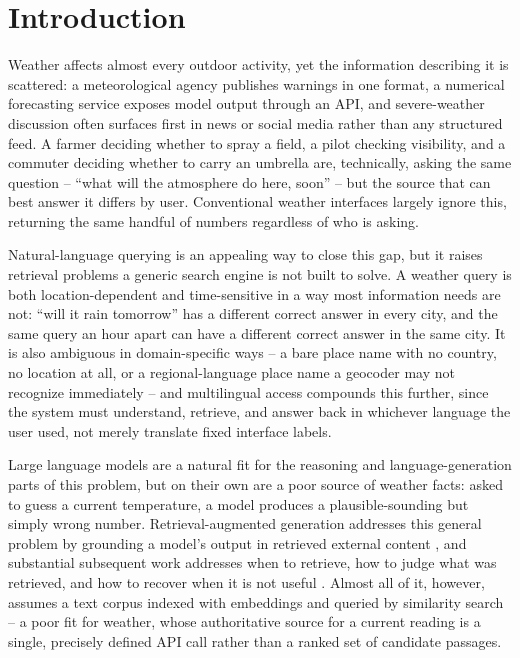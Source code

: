 \documentclass[sigconf,natbib=true,anonymous=true]{acmart}
\begin{document}
\maketitle

\section{Introduction}

Weather affects almost every outdoor activity, yet the information describing it is scattered: a meteorological agency publishes warnings in one format, a numerical forecasting service exposes model output through an API, and severe-weather discussion often surfaces first in news or social media rather than any structured feed. A farmer deciding whether to spray a field, a pilot checking visibility, and a commuter deciding whether to carry an umbrella are, technically, asking the same question -- ``what will the atmosphere do here, soon'' -- but the source that can best answer it differs by user. Conventional weather interfaces largely ignore this, returning the same handful of numbers regardless of who is asking.

Natural-language querying is an appealing way to close this gap, but it raises retrieval problems a generic search engine is not built to solve. A weather query is both location-dependent and time-sensitive in a way most information needs are not: ``will it rain tomorrow'' has a different correct answer in every city, and the same query an hour apart can have a different correct answer in the same city. It is also ambiguous in domain-specific ways -- a bare place name with no country, no location at all, or a regional-language place name a geocoder may not recognize immediately -- and multilingual access compounds this further, since the system must understand, retrieve, and answer back in whichever language the user used, not merely translate fixed interface labels.

Large language models are a natural fit for the reasoning and language-generation parts of this problem, but on their own are a poor source of weather facts: asked to guess a current temperature, a model produces a plausible-sounding but simply wrong number. Retrieval-augmented generation addresses this general problem by grounding a model's output in retrieved external content \citep{lewis2020rag}, and substantial subsequent work addresses when to retrieve, how to judge what was retrieved, and how to recover when it is not useful \citep{asai2024selfrag, yan2024crag, gao2023ragsurvey}. Almost all of it, however, assumes a text corpus indexed with embeddings and queried by similarity search -- a poor fit for weather, whose authoritative source for a current reading is a single, precisely defined API call rather than a ranked set of candidate passages.
\end{document}
